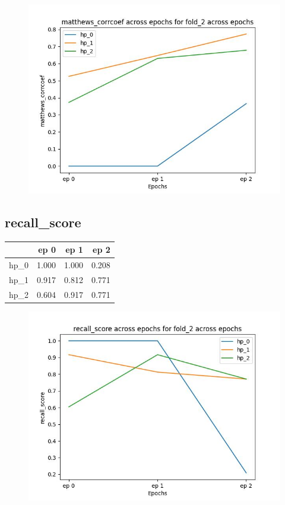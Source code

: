 \documentclass{article}
\begin{document}
\begin{figure}[H]
\includegraphics[scale = 0.75]{fold_2/matthews_corrcoef}
\end{figure}
\subsection{recall\_score}
\begin{tabular}{lrrr}
\toprule
{} &   ep 0 &   ep 1 &   ep 2 \\
\midrule
hp\_0 &  1.000 &  1.000 &  0.208 \\
hp\_1 &  0.917 &  0.812 &  0.771 \\
hp\_2 &  0.604 &  0.917 &  0.771 \\
\bottomrule
\end{tabular}

\begin{figure}[H]
\includegraphics[scale = 0.75]{fold_2/recall_score}
\end{figure}
\end{document}

